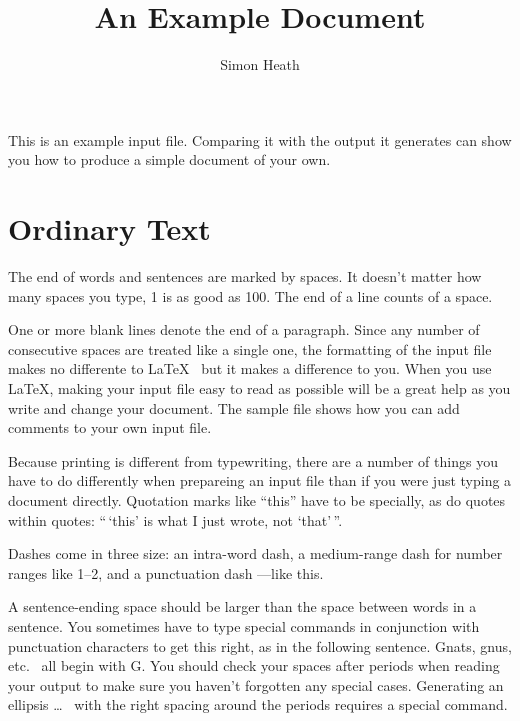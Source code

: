 \documentclass{article}
\title{An Example Document}  %
\author{Simon Heath} %
\date{}  %
\begin{document}

\maketitle  %

This is an example input file.  Comparing it with the output it generates
can show you how to produce a simple document of your own.

\section{Ordinary Text}

The end of words and sentences are marked    by    spaces.  It doesn't
matter how many spaces   you    type, 1 is as good as 100.  The end of
a line counts of a space.

One or more blank lines denote the end of a paragraph.  Since any number
of consecutive spaces are treated like a single one, the formatting of
the input file makes no differente to \LaTeX\  %
but it makes a difference to you.  When you use \LaTeX, making your
input file easy to read as possible will be a great help as you write
and change your document.  The sample file shows how you can add
comments to your own input file.

Because printing is different from typewriting, there are a number of things
you have to do differently when prepareing an input file than if
you were just typing a document directly.  Quotation marks like ``this''
have to be specially, as do quotes within quotes:
``\,`this'  %
is what I just wrote, not `that'\,''.

Dashes come in three size:  an intra-word dash, a medium-range dash for
number ranges like 1--2, and a punctuation dash ---like this.

A sentence-ending space should be larger than the space between words in
a sentence.  You sometimes have to type special commands in conjunction
with punctuation characters to get this right, as in the following sentence.  
Gnats, gnus, etc.\     %
all begin with G\@.    %
You should check your spaces after periods when reading your output to 
make sure you haven't forgotten any special cases.  Generating an 
ellipsis \ldots\   
with the right spacing around the periods requires a special command.
\end{document}
